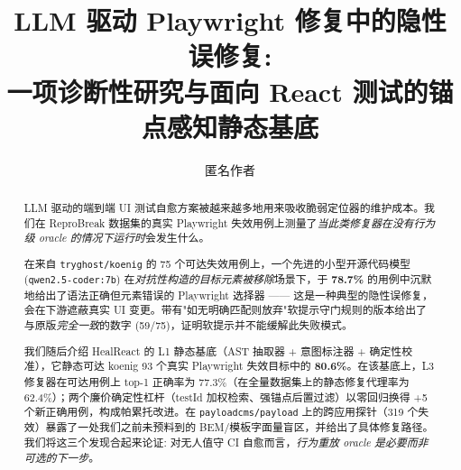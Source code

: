 \documentclass[sigconf,nonacm=true]{acmart}
\title{LLM 驱动 Playwright 修复中的隐性误修复:\\
       一项诊断性研究与面向 React 测试的锚点感知静态基底}
\author{匿名作者}
\affiliation{\institution{匿名机构}\country{}}
\begin{document}
\begin{abstract}
LLM 驱动的端到端 UI 测试自愈方案被越来越多地用来吸收脆弱定位器的维护成本。我们在 ReproBreak 数据集的真实 Playwright 失效用例上测量了\emph{当此类修复器在没有行为级 oracle 的情况下运行时}会发生什么。

在来自 \texttt{tryghost/koenig} 的 75 个可达失效用例上，一个先进的小型开源代码模型 (\texttt{qwen2.5-coder:7b}) 在\emph{对抗性构造的目标元素被移除}场景下，于 \textbf{78.7\%} 的用例中沉默地给出了语法正确但元素错误的 Playwright 选择器 —— 这是一种典型的隐性误修复，会在下游遮蔽真实 UI 变更。带有"如无明确匹配则放弃"软提示守门规则的版本给出了与原版\emph{完全一致}的数字 (59/75)，证明软提示并不能缓解此失败模式。

我们随后介绍 HealReact 的 L1 静态基底（AST 抽取器 + 意图标注器 + 确定性校准），它静态可达 koenig 93 个真实 Playwright 失效目标中的 \textbf{80.6\%}。在该基底上，L3 修复器在可达用例上 top-1 正确率为 77.3\%（在全量数据集上的静态修复代理率为 62.4\%）；两个廉价确定性杠杆（testId 加权检索、强锚点后置过滤）以零回归换得 +5 个新正确用例，构成帕累托改进。在 \texttt{payloadcms/payload} 上的跨应用探针（319 个失效）暴露了一处我们之前未预料到的 BEM/模板字面量盲区，并给出了具体修复路径。我们将这三个发现合起来论证: 对无人值守 CI 自愈而言，\emph{行为重放 oracle 是必要而非可选的下一步}。
\end{abstract}

\maketitle











\end{document}
